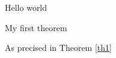 \documentclass{beamer}
\begin{document}
\begin{frame}
Hello world
\end{frame}

\begin{frame}
  \begin{theorem}
    \label{th1}
        My first theorem
  \end{theorem}
\end{frame}

\begin{frame}
As precised in Theorem \ref{th1}
\end{frame} 
\end{document}
